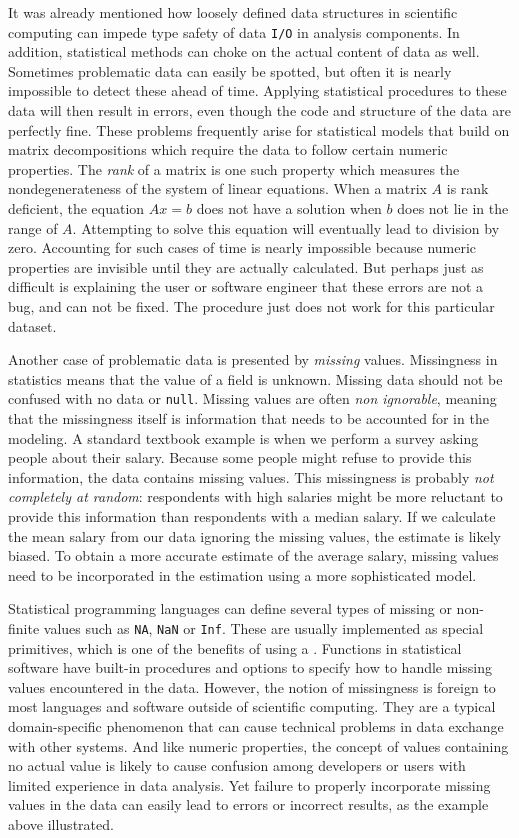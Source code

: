 It was already mentioned how loosely defined data structures in scientific computing can impede type safety of data \texttt{I/O} in analysis components. In addition, statistical methods can choke on the actual content of data as well. Sometimes problematic data can easily be spotted, but often it is nearly impossible to detect these ahead of time. Applying statistical procedures to these data will then result in errors, even though the code and structure of the data are perfectly fine. These problems frequently arise for statistical models that build on matrix decompositions which require the data to follow certain numeric properties. The \emph{rank} of a matrix is one such property which measures the nondegenerateness of the system of linear equations. When a matrix $A$ is rank deficient, the equation $Ax=b$ does not have a solution when $b$ does not lie in the range of $A$. Attempting to solve this equation will eventually lead to division by zero. Accounting for such cases of time is nearly impossible because numeric properties are invisible until they are actually calculated. But perhaps just as difficult is explaining the user or software engineer that these errors are not a bug, and can not be fixed. The procedure just does not work for this particular dataset.

Another case of problematic data is presented by \emph{missing} values. Missingness in statistics means that the value of a field is unknown. Missing data should not be confused with no data or \texttt{null}. Missing values are often \emph{non ignorable}, meaning that the missingness itself is information that needs to be accounted for in the modeling. A standard textbook example is when we perform a survey asking people about their salary. Because some people might refuse to provide this information, the data contains missing values. This missingness is probably \emph{not completely at random}: respondents with high salaries might be more reluctant to provide this information than respondents with a median salary. If we calculate the mean salary from our data ignoring the missing values, the estimate is likely biased. To obtain a more accurate estimate of the average salary, missing values need to be incorporated in the estimation using a more sophisticated model. 

Statistical programming languages can define several types of missing or non-finite values such as \texttt{NA}, \texttt{NaN} or \texttt{Inf}. These are usually implemented as special primitives, which is one of the benefits of using a \DSL. Functions in statistical software have built-in procedures and options to specify how to handle missing values encountered in the data. However, the notion of missingness is foreign to most languages and software outside of scientific computing. They are a typical domain-specific phenomenon that can cause technical problems in data exchange with other systems. And like numeric properties, the concept of values containing no actual value is likely to cause confusion among developers or users with limited experience in data analysis. Yet failure to properly incorporate missing values in the data can easily lead to errors or incorrect results, as the example above illustrated.

